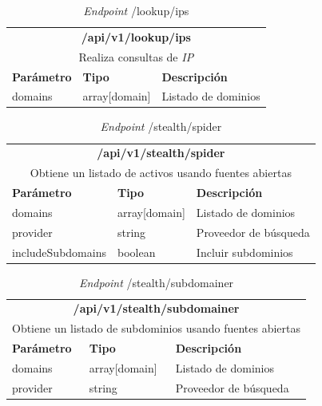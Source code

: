 \begin{table}[H]
    \begin{center}
        \begin{tabularx}{\textwidth}{| l | l | X |}
            \hline
            \multicolumn{3}{c}{ \textbf{/api/v1/lookup/ips} } \\
            \multicolumn{3}{c}{Realiza consultas de \textit{IP}} \\ \hline
            \textbf{Parámetro} & \textbf{Tipo} & \textbf{Descripción} \\ \hline
            domains & array[domain] & Listado de dominios \\ \hline
        \end{tabularx}
    \end{center}
    \caption{\textit{Endpoint} /lookup/ips}
    \label{tab:endpointips}
\end{table}

\begin{table}[H]
    \begin{center}
        \begin{tabularx}{\textwidth}{| l | l | X |}
            \hline
            \multicolumn{3}{c}{ \textbf{/api/v1/stealth/spider} } \\
            \multicolumn{3}{c}{Obtiene un listado de activos usando fuentes abiertas} \\ \hline
            \textbf{Parámetro} & \textbf{Tipo} & \textbf{Descripción} \\ \hline
            domains & array[domain] & Listado de dominios \\ \hline
            provider & string & Proveedor de búsqueda \\ \hline
            includeSubdomains & boolean & Incluir subdominios \\ \hline
        \end{tabularx}
    \end{center}
    \caption{\textit{Endpoint} /stealth/spider}
    \label{tab:endpointspider}
\end{table}

\begin{table}[H]
    \begin{center}
        \begin{tabularx}{\textwidth}{| l | l | X |}
            \hline
            \multicolumn{3}{c}{ \textbf{/api/v1/stealth/subdomainer} } \\
            \multicolumn{3}{c}{Obtiene un listado de subdominios usando fuentes abiertas} \\ \hline
            \textbf{Parámetro} & \textbf{Tipo} & \textbf{Descripción} \\ \hline
            domains & array[domain] & Listado de dominios \\ \hline
            provider & string & Proveedor de búsqueda \\ \hline
        \end{tabularx}
    \end{center}
    \caption{\textit{Endpoint} /stealth/subdomainer}
    \label{tab:endpointsubdomainer}
\end{table}

